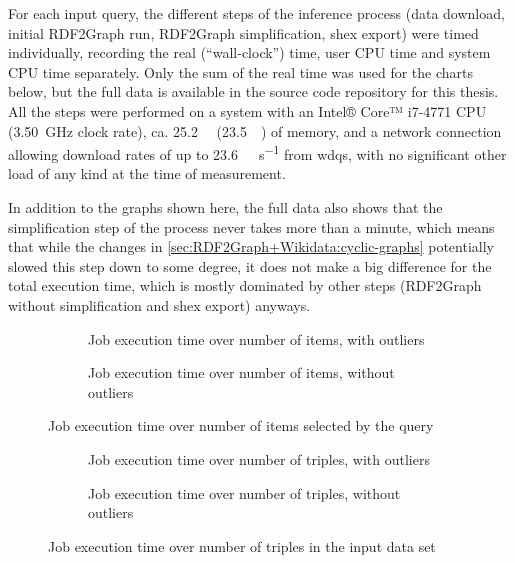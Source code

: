 For each input query,
the different steps of the inference process
(data download, initial \gls{RDF2Graph} run, \gls{RDF2Graph} simplification, \gls{shex} export)
were timed individually,
recording the real (“wall-clock”) time, user CPU time and system CPU time separately.
Only the sum of the real time was used for the charts below,
but the full data is available in the source code repository for this thesis.
All the steps were performed on a system
with an Intel® Core™ i7-4771 CPU (\SI{3.50}{\giga\hertz} clock rate),
ca. \SI{25.2}{\giga\byte} (\SI{23.5}{\gibi\byte}) of memory,
and a network connection allowing download rates of up to \SI{23.6}{\mebi\byte\per\second} from \gls{wdqs},
with no significant other load of any kind at the time of measurement.

In addition to the graphs shown here,
the full data also shows that the simplification step of the process
never takes more than a minute,
which means that while the changes in \cref{sec:RDF2Graph+Wikidata:cyclic-graphs} potentially slowed this step down to some degree,
it does not make a big difference for the total execution time,
which is mostly dominated by other steps
(\gls{RDF2Graph} without simplification and \gls{shex} export)
anyways.

\begin{figure}[ht]
  \begin{subfigure}{\textwidth}
    \centering
    
    \caption{Job execution time over number of \glspl{item}, with outliers}
    \label{fig:jobs-over-entities-with-outliers}
  \end{subfigure}
  \begin{subfigure}{\textwidth}
    \centering
    
    \caption{Job execution time over number of \glspl{item}, without outliers}
    \label{fig:jobs-over-entities-without-outliers}
  \end{subfigure}
  \caption{Job execution time over number of \glspl{item} selected by the query}
  \label{fig:jobs-over-entities}
\end{figure}

\begin{figure}[ht]
  \begin{subfigure}{\textwidth}
    \centering
    
    \caption{Job execution time over number of \glspl{triple}, with outliers}
    \label{fig:jobs-over-triples-with-outliers}
  \end{subfigure}
  \begin{subfigure}{\textwidth}
    \centering
    
    \caption{Job execution time over number of \glspl{triple}, without outliers}
    \label{fig:jobs-over-triples-without-outliers}
  \end{subfigure}
  \caption{Job execution time over number of \glspl{triple} in the input data set}
  \label{fig:jobs-over-triples}
\end{figure}

